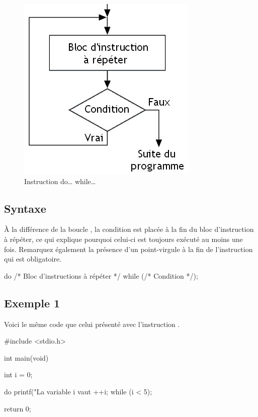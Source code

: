 \begin{figure}[htbp]
\centering
\includegraphics[scale=0.4]{images/instruction_do_while.jpg}
\caption{Instruction do\ldots{} while\ldots{}}
\end{figure}

\subsection{Syntaxe}
\label{syntaxe-2}

À la différence de la boucle , la condition est placée à
la fin du bloc d'instruction à répéter, ce qui explique pourquoi
celui-ci est toujours exécuté au moins une fois. Remarquez également la
présence d'un point-virgule à la fin de l'instruction qui est
obligatoire.

\begin{C}
do
{
    /* Bloc d'instructions à répéter */
} while (/* Condition */);
\end{C}

\subsection{Exemple 1}
\label{exemple-6}

Voici le même code que celui présenté avec l'instruction .

\begin{C}
#include <stdio.h>


int main(void)
{
    int i = 0;

    do
    {
        printf("La variable i vaut %
        ++i;
    } while (i < 5);

    return 0;
}
\end{C}

